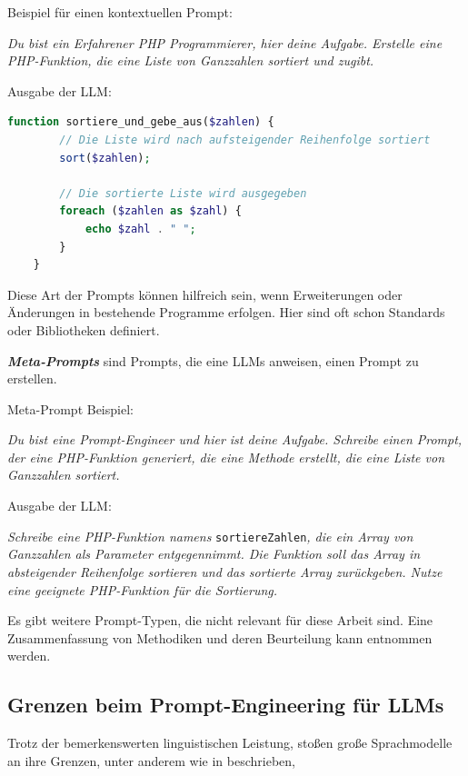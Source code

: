 Beispiel für einen kontextuellen Prompt:

\textit{Du bist ein Erfahrener PHP Programmierer, hier deine Aufgabe. Erstelle eine PHP-Funktion, die eine Liste von Ganzzahlen sortiert und zugibt.}\vspace{0.2cm}

Ausgabe der LLM:

\begin{lstlisting}[language=PHP]
	function sortiere_und_gebe_aus($zahlen) {
		// Die Liste wird nach aufsteigender Reihenfolge sortiert
		sort($zahlen);
		
		// Die sortierte Liste wird ausgegeben
		foreach ($zahlen as $zahl) {
			echo $zahl . " ";
		}
	}
\end{lstlisting}

Diese Art der Prompts können hilfreich sein, wenn Erweiterungen oder Änderungen in bestehende Programme erfolgen. Hier sind oft schon Standards oder Bibliotheken definiert.\vspace{0.2cm}

\textbf{\textit{Meta-Prompts}} sind Prompts, die eine LLMs anweisen, einen Prompt zu erstellen.\vspace{0.2cm}

Meta-Prompt Beispiel:

\textit{Du bist eine Prompt-Engineer und hier ist deine Aufgabe. Schreibe einen Prompt, der eine PHP-Funktion generiert, die eine Methode erstellt, die eine Liste von Ganzzahlen sortiert.}\vspace{0.2cm}

Ausgabe der LLM:

\textit{Schreibe eine PHP-Funktion namens} \texttt{sortiereZahlen}\textit{, die ein Array von Ganzzahlen als Parameter entgegennimmt. Die Funktion soll das Array in absteigender Reihenfolge sortieren und das sortierte Array zurückgeben. Nutze eine geeignete PHP-Funktion für die Sortierung.}\vspace{0.2cm}

Es gibt weitere Prompt-Typen, die nicht relevant für diese Arbeit sind. Eine Zusammenfassung von Methodiken und deren Beurteilung kann \cite{chen-2023} entnommen werden.


\subsection{Grenzen beim Prompt-Engineering für LLMs}
Trotz der bemerkenswerten linguistischen Leistung, stoßen große Sprachmodelle an ihre Grenzen, unter anderem wie in \cite{amatriain-2024} beschrieben,

